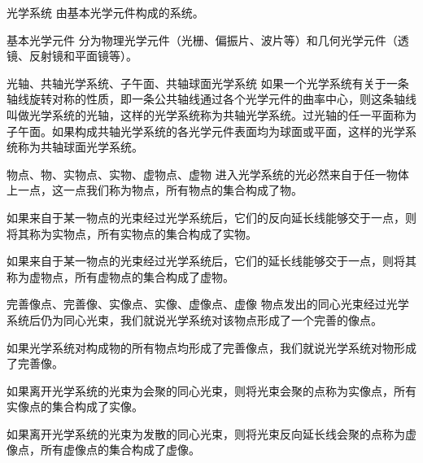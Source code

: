 

\begin{definition}{光学系统}
由基本光学元件构成的系统。
\end{definition}

\begin{definition}{基本光学元件}
分为物理光学元件（光栅、偏振片、波片等）和几何光学元件（透镜、反射镜和平面镜等）。
\end{definition}

\begin{definition}{光轴、共轴光学系统、子午面、共轴球面光学系统}
如果一个光学系统有关于一条轴线旋转对称的性质，即一条公共轴线通过各个光学元件的曲率中心，则这条轴线叫做光学系统的光轴，这样的光学系统称为共轴光学系统。过光轴的任一平面称为子午面。如果构成共轴光学系统的各光学元件表面均为球面或平面，这样的光学系统称为共轴球面光学系统。
\end{definition}

\begin{definition}{物点、物、实物点、实物、虚物点、虚物}
进入光学系统的光必然来自于任一物体上一点，这一点我们称为物点，所有物点的集合构成了物。

如果来自于某一物点的光束经过光学系统后，它们的反向延长线能够交于一点，则将其称为实物点，所有实物点的集合构成了实物。

如果来自于某一物点的光束经过光学系统后，它们的延长线能够交于一点，则将其称为虚物点，所有虚物点的集合构成了虚物。
\end{definition}

\begin{definition}{完善像点、完善像、实像点、实像、虚像点、虚像}
物点发出的同心光束经过光学系统后仍为同心光束，我们就说光学系统对该物点形成了一个完善的像点。

如果光学系统对构成物的所有物点均形成了完善像点，我们就说光学系统对物形成了完善像。

如果离开光学系统的光束为会聚的同心光束，则将光束会聚的点称为实像点，所有实像点的集合构成了实像。

如果离开光学系统的光束为发散的同心光束，则将光束反向延长线会聚的点称为虚像点，所有虚像点的集合构成了虚像。
\end{definition}

